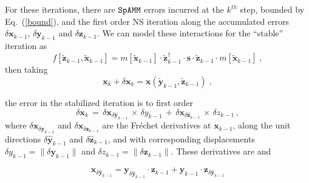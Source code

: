 \documentclass[letterpaper,twocolumn,amsmath,amsfont,amssymb,english,aps,jcp,preprintnumbers,groupaddress,nofootinbib,tightenlines]{revtex4}
\newcommand{\mat}[1]{\boldsymbol{#1}}
\begin{document}
For these iterations, there are $\tt SpAMM$ errors incurred at the $k^{th}$ step,  bounded by Eq.~(\ref{bound}),
and the first order NS iteration along the accumulated errors 
$\delta \mat{x}_{k-1}$,  $\delta \mat{y}_{k-1}$  and $\delta \mat{z}_{k-1}$.  We can model these interactions for the ``stable'' iteration as
\begin{equation}
f \left[\widetilde{\mat{z}}_{k-1} , \widetilde{\mat{x}}_{k-1} \right] =
m \left[ \widetilde{\mat{x}}_{k-1}\right] \cdot \widetilde{\mat{z}}^\dagger_{k-1}  
\cdot \mat{s} \cdot \widetilde{\mat{z}}_{k-1} \cdot m\left[ \widetilde{\mat{x}}_{k-1} \right] \; ,
\end{equation}
then taking
\begin{equation}
\mat{x}_k + \delta \mat{x}_k = \mat{x} \left(\widetilde{\mat{y}}_{k-1} , \widetilde{\mat{z}}_{k-1} \right) \;, 
\end{equation}


the error in the stabilized iteration is to first order
\begin{equation}
\delta \mat{x}_k \, = \,  {\delta \mat{x}}_{\delta \widehat{\mat{y}}_{k-1}}  \, {\scriptstyle \times} \, \delta y_{k-1} 
                 \, + \,  {\delta \mat{x}}_{\delta \widehat{\mat{z}}_{k-1}}  \, {\scriptstyle \times} \, \delta z_{k-1} \, ,
\end{equation}
where ${\delta \mat{x}}_{\delta \mat{y}_{k-1}}$ and ${\delta \mat{x}}_{\delta \mat{z}_{k-1}}$ are the Fr\'{e}chet derivatives \cite{} at $\mat{x}_{k-1}$, 
along the unit directions  $\delta \widehat{\mat{y}}_{k-1}$ and $\delta \widehat{\mat{z}}_{k-1}$, and with corresponding displacements 
$\delta y_{k-1} = \lVert \delta \mat{y}_{k-1} \rVert$  and $\delta z_{k-1}=\lVert \delta \mat{z}_{k-1} \rVert$.  These derivatives are
and 


\begin{equation}
 \mat{x}_{\delta \widehat{ \mat{y}}_{k-1}} =   \mat{y}_{\delta \widehat{ \mat{y}}_{k-1}} \cdot \mat{z}_{k-1}  + \mat{y}_{k-1}  \cdot \mat{z}_{\delta \widehat{ \mat{y}}_{k-1}} 
\end{equation}
\end{document}
